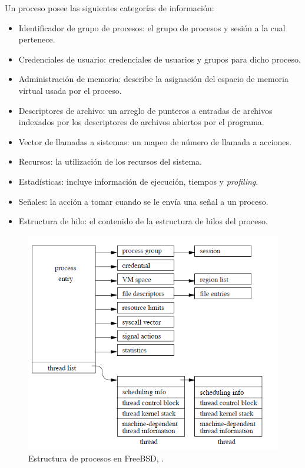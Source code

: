 \documentclass[a4paper]{book}
\begin{document}
Un proceso posee las siguientes categorías de información:
\begin{itemize}
\item Identificador de grupo de procesos: el grupo de procesos y sesión a la cual pertenece.
\item Credenciales de usuario: credenciales de usuarios y grupos para dicho proceso.
\item Administración de memoria: describe la asignación del espacio de memoria virtual usada por el proceso.
\item Descriptores de archivo: un arreglo de punteros a entradas de archivos indexados por los descriptores de archivos abiertos por el programa.
\item Vector de llamadas a sistemas: un mapeo de número de llamada a acciones.
\item Recursos: la utilización de los recursos del sistema.
\item Estadísticas: incluye información de ejecución, tiempos y \emph{profiling}.
\item Señales: la acción a tomar cuando se le envía una señal a un proceso.
\item Estructura de hilo: el contenido de la estructura de hilos del proceso.
\end{itemize}

\begin{figure}[t]
\begin{center}
	\includegraphics[scale=0.7]{./imagenes/estructuraprocesos.png}
	\caption{Estructura de procesos en FreeBSD, \cite[Capítulo 4]{freebsdOS}.}
\end{center}
\end{figure}
\end{document}
